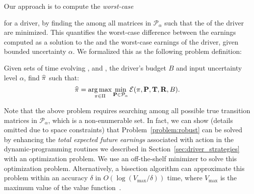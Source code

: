 Our approach is to compute the \emph{worst-case}{ {\totalexpectedearnings} for a driver, by
  finding the {\truetransitionmatrix} among all matrices in $\mathcal{P}_\alpha$ 
 such that the {\totalexpectedearnings} of the driver
 are minimized.  
This quantifies the worst-case difference between the earnings computed
as a solution to the {\originalproblem} and the worst-case earnings of the
driver, given bounded uncertainty $\alpha$.
We formalized this as the following problem definition:

\begin{problem}[{\robustproblem}]\label{problem:robust}
Given sets of time evolving {\countmatrix}, {\traveltimematrix} and {\rewardsmatrix}, the driver's budget $B$ and input uncertainty level $\alpha$,
find $\widehat{\pi}$
such that:
\[  \widehat{\pi} = \operatorname*{arg\,max}_{\pi\in \Pi}
\min_{{\mathbf{P}}\in\mathcal{P}_\alpha}\mathcal{E}(\pi,{\mathbf{P}},{\mathbf{T}},{\mathbf{R}},B).
\]
\end{problem}
Note that the above problem requires searching among all possible true transition 
matrices in $\mathcal{P}_\alpha$, which is a non-enumerable set. 
In fact, we can show (details omitted due to space constraints) that 
Problem~\ref{problem:robust} can be solved by enhancing the \emph{total expected future earnings} associated with {\getpassenger} action in the  dynamic-programming routines we described in Section~\ref{sec:driver_strategies}
with an optimization problem. We use an off-the-shelf minimizer to solve this optimization problem. 
Alternatively, a bisection algorithm can approximate this problem within an accuracy $\delta$ in $O(\log(V_{\max}/\delta))$ time, where $V_{\max}$ is the maximum value of the value function~\cite{nilim2004robustness}.


}
